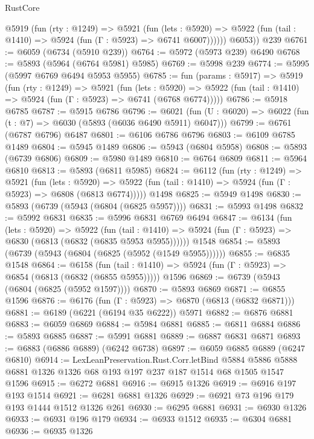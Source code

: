 \begin{lexlean}{RustCore}
\begin{coremodule}
          @5919
            (fun (rty : @1249) =>
            @5921
              (fun (lets : @5920) =>
              @5922 (fun (tail : @1410) => @5924 (fun (Γ : @5923) => @6741 @6007))))))
        @6053))
    @239
@6761 := @6059 (@6734 (@5910 @239))
@6764 := @5972 (@5973 @239) @6490
@6768 := @5893 (@5964 (@6764 @5981) @5985)
@6769 := @5998 @239
@6774 := @5995 (@5997 @6769 @6494 @5953 @5955)
@6785 := fun (params : @5917) =>
  @5919
    (fun (rty : @1249) =>
    @5921
      (fun (lets : @5920) =>
      @5922 (fun (tail : @1410) => @5924 (fun (Γ : @5923) => @6741 (@6768 @6774)))))
@6786 := @5918 @6785
@6787 := @5915 @6786
@6796 := @6021 (fun (U : @6020) => @6022 (fun (t : @7) => @6030 (@5893 (@6036 @6490 @5911) @6047)))
@6799 := @6761 (@6787 @6796) @6487
@6801 := @6106 @6786 @6796
@6803 := @6109 @6785 @1489
@6804 := @5945 @1489
@6806 := @5943 (@6804 @5958)
@6808 := @5893 (@6739 @6806)
@6809 := @5980 @1489
@6810 := @6764 @6809
@6811 := @5964 @6810
@6813 := @5893 (@6811 @5985)
@6824 := @6112
    (fun (rty : @1249) =>
    @5921
      (fun (lets : @5920) =>
      @5922 (fun (tail : @1410) => @5924 (fun (Γ : @5923) => @6808 (@6813 @6774)))))
    @1498
@6825 := @5949 @1498
@6830 := @5893 (@6739 (@5943 (@6804 (@6825 @5957))))
@6831 := @5993 @1498
@6832 := @5992 @6831
@6835 := @5996 @6831 @6769 @6494
@6847 := @6134
    (fun (lets : @5920) =>
    @5922
      (fun (tail : @1410) => @5924 (fun (Γ : @5923) => @6830 (@6813 (@6832 (@6835 @5953 @5955))))))
    @1548
@6854 := @5893 (@6739 (@5943 (@6804 (@6825 (@5952 (@1549 @5955))))))
@6855 := @6835 @1548
@6864 := @6158
    (fun (tail : @1410) => @5924 (fun (Γ : @5923) => @6854 (@6813 (@6832 (@6855 @5955)))))
    @1596
@6869 := @6739 (@5943 (@6804 (@6825 (@5952 @1597))))
@6870 := @5893 @6869
@6871 := @6855 @1596
@6876 := @6176 (fun (Γ : @5923) => @6870 (@6813 (@6832 @6871)))
@6881 := @6189 (@6221 (@6194 @35 @6222)) @5971
@6882 := @6876 @6881
@6883 := @6059 @6869
@6884 := @5984 @6881
@6885 := @6811 @6884
@6886 := @5893 @6885
@6887 := @5991 @6881
@6889 := @6887 @6831 @6871
@6893 := @6883 (@6886 @6889) (@6242 @6738)
@6897 := @6059 @6885 @6889 (@6247 @6810)
@6914 := LexLeanPreservation.Rust.Corr.letBind
    @5884
    @5886
    @5888
    @6881
    @1326
    @1326
    @68
    @193
    @197
    @237
    @187
    @1514
    @68
    @1505
    @1547
    @1596
@6915 := @6272 @6881
@6916 := @6915 @1326
@6919 := @6916 @197 @193 @1514
@6921 := @6281 @6881 @1326
@6929 := @6921 @73 @196 @179 @193 @1444 @1512 @1326 @261
@6930 := @6295 @6881
@6931 := @6930 @1326
@6933 := @6931 @196 @179
@6934 := @6933 @1512
@6935 := @6304 @6881
@6936 := @6935 @1326

\end{coremodule}
\end{lexlean}
